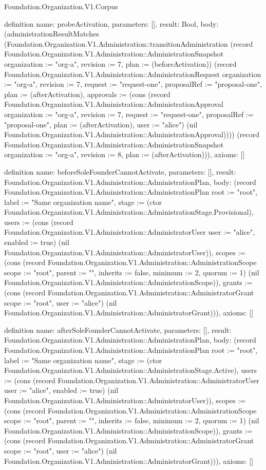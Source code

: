 \begin{lexlean}{Foundation.Organization.V1.Corpus}
\begin{semanticmodule}
definition{
  name: probeActivation,
  parameters: [],
  result: Bool,
  body: (administrationResultMatches (Foundation.Organization.V1.Administration::transitionAdministration (record Foundation.Organization.V1.Administration::AdministrationSnapshot {organization := "org-a", revision := 7, plan := (beforeActivation)}) (record Foundation.Organization.V1.Administration::AdministrationRequest {organization := "org-a", revision := 7, request := "request-one", proposalRef := "proposal-one", plan := (afterActivation), approvals := (cons (record Foundation.Organization.V1.Administration::AdministrationApproval {organization := "org-a", revision := 7, request := "request-one", proposalRef := "proposal-one", plan := (afterActivation), user := "alice"}) (nil Foundation.Organization.V1.Administration::AdministrationApproval))})) (record Foundation.Organization.V1.Administration::AdministrationSnapshot {organization := "org-a", revision := 8, plan := (afterActivation)})),
  axioms: []
}

definition{
  name: beforeSoleFounderCannotActivate,
  parameters: [],
  result: Foundation.Organization.V1.Administration::AdministrationPlan,
  body: (record Foundation.Organization.V1.Administration::AdministrationPlan {root := "root", label := "Same organization name", stage := (ctor Foundation.Organization.V1.Administration::AdministrationStage.Provisional), users := (cons (record Foundation.Organization.V1.Administration::AdministratorUser {user := "alice", enabled := true}) (nil Foundation.Organization.V1.Administration::AdministratorUser)), scopes := (cons (record Foundation.Organization.V1.Administration::AdministrationScope {scope := "root", parent := "", inherits := false, minimum := 2, quorum := 1}) (nil Foundation.Organization.V1.Administration::AdministrationScope)), grants := (cons (record Foundation.Organization.V1.Administration::AdministratorGrant {scope := "root", user := "alice"}) (nil Foundation.Organization.V1.Administration::AdministratorGrant))}),
  axioms: []
}

definition{
  name: afterSoleFounderCannotActivate,
  parameters: [],
  result: Foundation.Organization.V1.Administration::AdministrationPlan,
  body: (record Foundation.Organization.V1.Administration::AdministrationPlan {root := "root", label := "Same organization name", stage := (ctor Foundation.Organization.V1.Administration::AdministrationStage.Active), users := (cons (record Foundation.Organization.V1.Administration::AdministratorUser {user := "alice", enabled := true}) (nil Foundation.Organization.V1.Administration::AdministratorUser)), scopes := (cons (record Foundation.Organization.V1.Administration::AdministrationScope {scope := "root", parent := "", inherits := false, minimum := 2, quorum := 1}) (nil Foundation.Organization.V1.Administration::AdministrationScope)), grants := (cons (record Foundation.Organization.V1.Administration::AdministratorGrant {scope := "root", user := "alice"}) (nil Foundation.Organization.V1.Administration::AdministratorGrant))}),
  axioms: []
}


\end{semanticmodule}
\end{lexlean}
